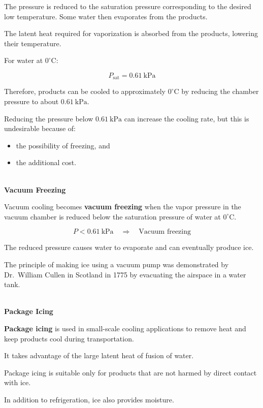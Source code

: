 \documentclass[12pt]{article}
\begin{document}
The pressure is reduced to the saturation pressure corresponding to the desired low temperature. Some water then evaporates from the products.

The latent heat required for vaporization is absorbed from the products, lowering their temperature.

For water at $0^\circ\mathrm{C}$:

\begin{equation*}
P_{\mathrm{sat}}=0.61~\mathrm{kPa}
\end{equation*}

Therefore, products can be cooled to approximately $0^\circ\mathrm{C}$ by reducing the chamber pressure to about $0.61~\mathrm{kPa}$.

Reducing the pressure below $0.61~\mathrm{kPa}$ can increase the cooling rate, but this is undesirable because of:
\begin{itemize}
    \item the possibility of freezing, and
    \item the additional cost.
\end{itemize}

\textbf{\\ Vacuum Freezing}

Vacuum cooling becomes \textbf{vacuum freezing} when the vapor pressure in the vacuum chamber is reduced below the saturation pressure of water at $0^\circ\mathrm{C}$.

\begin{equation*}
P<0.61~\mathrm{kPa}
\quad\Rightarrow\quad
\text{Vacuum freezing}
\end{equation*}

The reduced pressure causes water to evaporate and can eventually produce ice.

The principle of making ice using a vacuum pump was demonstrated by Dr.~William Cullen in Scotland in 1775 by evacuating the airspace in a water tank.

\textbf{\\ Package Icing}

\textbf{Package icing} is used in small-scale cooling applications to remove heat and keep products cool during transportation.

It takes advantage of the large latent heat of fusion of water.

Package icing is suitable only for products that are not harmed by direct contact with ice.

In addition to refrigeration, ice also provides moisture.
\end{document}
